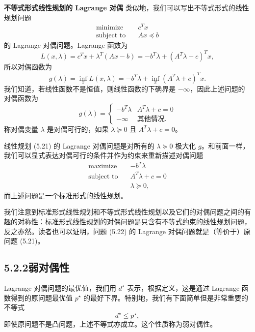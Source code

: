 \documentclass[UTF8, 12pt, fontset=fandol, oneside]{ctexart}
\begin{document}
\noindent\textbf{不等式形式线性规划的 Lagrange 对偶}\quad
类似地，我们可以写出不等式形式的线性规划问题
\begin{equation}
\begin{aligned}
\text{minimize}\quad & c^Tx\\
\text{subject to}\quad & Ax\preceq b
\end{aligned}
\tag{5.21}
\end{equation}
的 Lagrange 对偶问题。Lagrange 函数为
\[
L(x,\lambda)=c^Tx+\lambda^T(Ax-b)=-b^T\lambda+(A^T\lambda+c)^Tx,
\]
所以对偶函数为
\[
g(\lambda)=\inf_x L(x,\lambda)=-b^T\lambda+\inf_x(A^T\lambda+c)^Tx.
\]
我们知道，若线性函数不是恒值，则线性函数的下确界是 $-\infty$，因此上述问题的对偶函数为
\[
g(\lambda)=
\begin{cases}
-b^T\lambda & A^T\lambda+c=0\\
-\infty & \text{其他情况}.
\end{cases}
\]
称对偶变量 $\lambda$ 是对偶可行的，如果 $\lambda\succeq 0$ 且 $A^T\lambda+c=0$。

线性规划 (5.21) 的 Lagrange 对偶问题是对所有的 $\lambda\succeq 0$ 极大化 $g$。和前面一样，我们可以显式表达对偶可行的条件并作为约束来重新描述对偶问题
\begin{equation}
\begin{aligned}
\text{maximize}\quad & -b^T\lambda\\
\text{subject to}\quad & A^T\lambda+c=0\\
& \lambda\succeq 0,
\end{aligned}
\tag{5.22}
\end{equation}
而上述问题是一个标准形式的线性规划。

我们注意到标准形式线性规划和不等式形式线性规划以及它们的对偶问题之间的有趣的对称性：标准形式线性规划的对偶问题是只含有不等式约束的线性规划问题，反之亦然。读者也可以证明，问题 (5.22) 的 Lagrange 对偶问题就是（等价于）原问题 (5.21)。

\subsection*{5.2.2\quad 弱对偶性}

Lagrange 对偶问题的最优值，我们用 $d^\star$ 表示，根据定义，这是通过 Lagrange 函数得到的原问题最优值 $p^\star$ 的最好下界。特别地，我们有下面简单但是非常重要的不等式
\begin{equation}
d^\star\leq p^\star,
\tag{5.23}
\end{equation}
即使原问题不是凸问题，上述不等式亦成立。这个性质称为弱对偶性。
\end{document}
